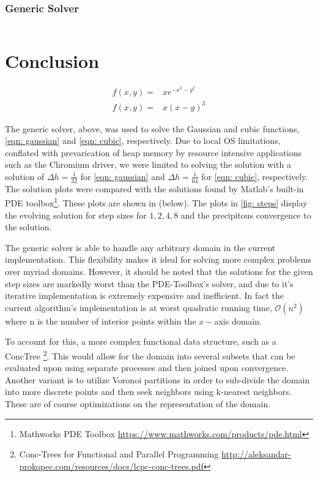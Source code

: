 \documentclass[10pt,a4paper]{article}
\begin{document}
 
\inputminted{python}{code/problem_one_part_two.py}


\subsubsection{Generic Solver}

 
\inputminted{python}{code/matrix_solver.py}

 \section*{Conclusion}
 
\begin{subequations}
\begin{align}
f(x, y) =& x e^{-x^2 - y^2} \label{eqn: gaussian}\\
f(x, y) =& x \left( x - y \right)^3 \label{eqn: cubic}
\end{align}
\end{subequations}

The generic solver, above, was used to solve the Gaussian and cubic functions, \cref{eqn: gaussian} and \cref{eqn: cubic}, respectively. Due to local OS limitations, conflated with prevarication of heap memory by resource intensive applications such as the Chromium driver, we were limited to solving the solution with a solution of $\Delta h = \frac{1}{32}$ for \cref{eqn: gaussian} and $\Delta h = \frac{1}{64}$ for \cref{eqn: cubic}, respectively. The solution plots were compared with the solutions found by Matlab's built-in PDE toolbox\footnote{Mathworks PDE Toolbox \url{https://www.mathworks.com/products/pde.html}}. These plots are shown in  (below). The plots in \cref{fig: steps} display the evolving solution for step sizes for  $1, 2, 4, 8$ and the precipitous convergence to the solution.

The generic solver is able to handle any arbitrary domain in the current implementation. This flexibility makes it ideal for solving more complex problems over myriad domains. However, it should be noted that the solutions for the given step sizes are markedly worst than the PDE-Toolbox's solver, and due to it's iterative implementation is extremely expensive and inefficient. In fact the current algorithm's implementation is at worst quadratic running time, $\mathcal{O}(n^2)$ where n is the number of interior points within the $x-$axis domain.

To account for this, a more complex functional data structure, such as a ConcTree \footnote{Conc-Trees for Functional and Parallel
Programming \url{http://aleksandar-prokopec.com/resources/docs/lcpc-conc-trees.pdf}}. This would allow for the domain into several subsets that can be evaluated upon using separate processes and then joined upon convergence. Another variant is to utilize Voronoi partitions in order to sub-divide the domain into more discrete points and then seek neighbors using k-nearest neighbors. These are of course optimizations on the representation of the domain.
\end{document}
